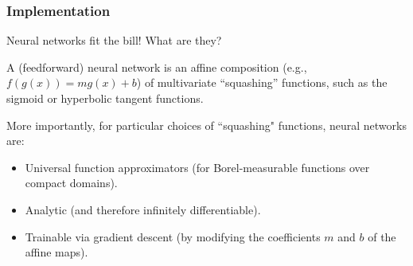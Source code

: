 \begin{frame}
    \frametitle{Implementation}

    Neural networks fit the bill! What are they?

    \medskip
    \pause

    A (feedforward) neural network is an affine composition (e.g., $f(g(x)) = m g(x) + b$) of multivariate ``squashing''
    functions, such as the sigmoid or hyperbolic tangent functions. 
   
    \bigskip
    \pause More importantly, for particular choices of ``squashing" functions, neural networks are:
    \bigskip

    \begin{itemize}
        \setlength\itemsep{1.5em}
        \item Universal function approximators (for Borel-measurable functions over compact domains).
        \item Analytic (and therefore infinitely differentiable).
        \item Trainable via gradient descent (by modifying the coefficients $m$ and $b$ of the affine maps).
    \end{itemize}
\end{frame}